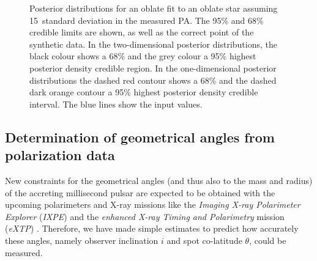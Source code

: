 \documentclass{aa}
\newcommand{\red}[1]{\textcolor{red}{#1}}
\newcommand{\blue}[1]{\textcolor{blue}{#1}}
\begin{document}
\begin{figure}
\caption{
Posterior distributions for an oblate fit to an oblate star assuming 15\degr\ standard deviation in the measured PA. The 95\% and 68\% credible limits are shown, as well as the correct point of the synthetic data.
In the two-dimensional posterior distributions, the black colour shows  a  68\%  and  the grey  colour a 95\%  highest  posterior  density credible region. 
In the one-dimensional posterior distributions the dashed red  contour shows a 68\% and the dashed dark orange contour a 95\% highest posterior density credible interval. 
The blue lines show the input values.
} 
\label{fig:oblobl_he}
\end{figure}

\subsection{Determination of geometrical angles from polarization data}\label{sec:res1a}

New constraints for the geometrical angles (and thus also to the mass and radius) of the accreting millisecond pulsar are expected to be obtained with the upcoming polarimeters and X-ray missions like the \textit{Imaging X-ray Polarimeter Explorer} (\textit{IXPE}) \citep{IXPE} and the \textit{enhanced X-ray Timing and Polarimetry} mission (\textit{eXTP}) \citep{EXTP,dmatter_extp}.
Therefore, we have made simple estimates to predict how accurately these angles, namely observer inclination $i$ and spot co-latitude $\theta$, could be measured.


\end{document}
